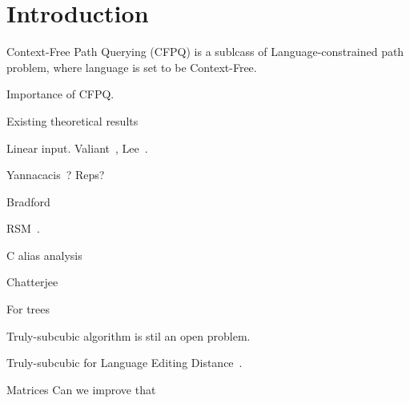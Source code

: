 \section{Introduction}


Context-Free Path Querying (CFPQ) is a sublcass of Language-constrained path problem, where language is set to be Context-Free.

Importance of CFPQ.



Existing theoretical results

Linear input. Valiant~\cite{Valiant:1975:GCR:1739932.1740048}, Lee~\cite{Lee:2002:FCG:505241.505242}.

Yannacacis~\cite{Yannakakis}? Reps?

Bradford~\cite{8249039}

RSM~\cite{10.1145/1328438.1328460}.

C alias analysis~\cite{10.1145/2714064.2660213}

Chatterjee~\cite{10.1145/3158118} 

For trees



Truly-subcubic algorithm is stil an open problem.

Truly-subcubic for Language Editing Distance~\cite{doi:10.1137/17M112720X}.

Matrices  Can we improve that

